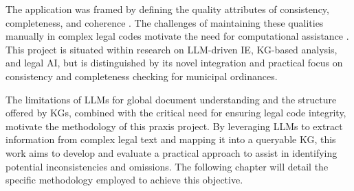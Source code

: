 The application was framed by defining the quality attributes of consistency, completeness, and coherence \parencite{RefWorks:RefID:10-zowghi2003interplay}. The challenges of maintaining these qualities manually in complex legal codes motivate the need for computational assistance \parencite{RefWorks:RefID:68-beth2018bills}. This project is situated within research on LLM-driven IE, KG-based analysis, and legal AI, but is distinguished by its novel integration and practical focus on consistency and completeness checking for municipal ordinances.

The limitations of LLMs for global document understanding and the structure offered by KGs, combined with the critical need for ensuring legal code integrity, motivate the methodology of this praxis project. By leveraging LLMs to extract information from complex legal text and mapping it into a queryable KG, this work aims to develop and evaluate a practical approach to assist in identifying potential inconsistencies and omissions. The following chapter will detail the specific methodology employed to achieve this objective.
